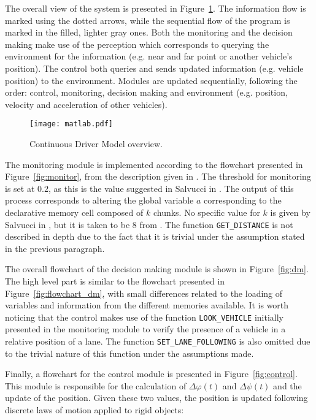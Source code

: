 The overall view of the system is presented in Figure~\ref{fig:driver_model_overview}. The information flow is marked using the dotted arrows, while the sequential flow of the program is marked in the filled, lighter gray ones. Both the monitoring and the decision making make use of the perception which corresponds to querying the environment for the information (e.g. near and far point or another vehicle's position). The control both queries and sends updated information (e.g. vehicle position) to the environment. Modules are updated sequentially, following the order: control, monitoring, decision making and environment (e.g. position, velocity and acceleration of other vehicles).

\vspace{1em}
\begin{figure}[h]
    \centering
    \texttt{[image: matlab.pdf]}
    \caption{Continuous Driver Model overview.}
    \label{fig:driver_model_overview}
\end{figure}

The monitoring module is implemented according to the flowchart presented in Figure~\ref{fig:monitor}, from the description given in \cite{salvucci_1}. The threshold for monitoring is set at $0.2$, as this is the value suggested in Salvucci in \cite{salvucci_1}. The output of this process corresponds to altering the global variable $a$ corresponding to the declarative memory cell composed of $k$ chunks. No specific value for $k$ is given by Salvucci in \cite{salvucci_1}, but it is taken to be 8 from \cite{lam}. The function \texttt{GET\_DISTANCE} is not described in depth due to the fact that it is trivial under the assumption stated in the previous paragraph.

The overall flowchart of the decision making module is shown in Figure~\ref{fig:dm}. The high level part is similar to the flowchart presented in Figure~\ref{fig:flowchart_dm}, with small differences related to the loading of variables and information from the different memories available. It is worth noticing that the control makes use of the function \texttt{LOOK\_VEHICLE} initially presented in the monitoring module to verify the presence of a vehicle in a relative position of a lane. The function \texttt{SET\_LANE\_FOLLOWING} is also omitted due to the trivial nature of this function under the assumptions made.

Finally, a flowchart for the control module is presented in Figure~\ref{fig:control}. This module is responsible for the calculation of $\Delta\varphi(t)$ and $\Delta\psi(t)$ and the update of the position. Given these two values, the position is updated following discrete laws of motion applied to rigid objects:

